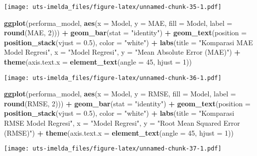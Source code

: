\documentclass[
]{article}
\newenvironment{Shaded}{\begin{snugshade}}{\end{snugshade}}
\newcommand{\AttributeTok}[1]{\textcolor[rgb]{0.13,0.29,0.53}{#1}}
\newcommand{\DecValTok}[1]{\textcolor[rgb]{0.00,0.00,0.81}{#1}}
\newcommand{\FloatTok}[1]{\textcolor[rgb]{0.00,0.00,0.81}{#1}}
\newcommand{\FunctionTok}[1]{\textcolor[rgb]{0.13,0.29,0.53}{\textbf{#1}}}
\newcommand{\NormalTok}[1]{#1}
\newcommand{\SpecialCharTok}[1]{\textcolor[rgb]{0.81,0.36,0.00}{\textbf{#1}}}
\newcommand{\StringTok}[1]{\textcolor[rgb]{0.31,0.60,0.02}{#1}}
\begin{document}
\texttt{[image: uts-imelda\_files/figure-latex/unnamed-chunk-35-1.pdf]}

\begin{Shaded}
\begin{Highlighting}[]
\FunctionTok{ggplot}\NormalTok{(performa\_model, }\FunctionTok{aes}\NormalTok{(}\AttributeTok{x =}\NormalTok{ Model, }\AttributeTok{y =}\NormalTok{ MAE, }\AttributeTok{fill =}\NormalTok{ Model, }\AttributeTok{label =} \FunctionTok{round}\NormalTok{(MAE, }\DecValTok{2}\NormalTok{))) }\SpecialCharTok{+}
  \FunctionTok{geom\_bar}\NormalTok{(}\AttributeTok{stat =} \StringTok{"identity"}\NormalTok{) }\SpecialCharTok{+}
  \FunctionTok{geom\_text}\NormalTok{(}\AttributeTok{position =} \FunctionTok{position\_stack}\NormalTok{(}\AttributeTok{vjust =} \FloatTok{0.5}\NormalTok{), }\AttributeTok{color =} \StringTok{"white"}\NormalTok{) }\SpecialCharTok{+}
  \FunctionTok{labs}\NormalTok{(}\AttributeTok{title =} \StringTok{"Komparasi MAE Model Regresi"}\NormalTok{, }\AttributeTok{x =} \StringTok{"Model Regresi"}\NormalTok{, }\AttributeTok{y =} \StringTok{"Mean Absolute Error (MAE)"}\NormalTok{) }\SpecialCharTok{+}
  \FunctionTok{theme}\NormalTok{(}\AttributeTok{axis.text.x =} \FunctionTok{element\_text}\NormalTok{(}\AttributeTok{angle =} \DecValTok{45}\NormalTok{, }\AttributeTok{hjust =} \DecValTok{1}\NormalTok{))}
\end{Highlighting}
\end{Shaded}

\texttt{[image: uts-imelda\_files/figure-latex/unnamed-chunk-36-1.pdf]}

\begin{Shaded}
\begin{Highlighting}[]
\FunctionTok{ggplot}\NormalTok{(performa\_model, }\FunctionTok{aes}\NormalTok{(}\AttributeTok{x =}\NormalTok{ Model, }\AttributeTok{y =}\NormalTok{ RMSE, }\AttributeTok{fill =}\NormalTok{ Model, }\AttributeTok{label =} \FunctionTok{round}\NormalTok{(RMSE, }\DecValTok{2}\NormalTok{))) }\SpecialCharTok{+}
  \FunctionTok{geom\_bar}\NormalTok{(}\AttributeTok{stat =} \StringTok{"identity"}\NormalTok{) }\SpecialCharTok{+}
  \FunctionTok{geom\_text}\NormalTok{(}\AttributeTok{position =} \FunctionTok{position\_stack}\NormalTok{(}\AttributeTok{vjust =} \FloatTok{0.5}\NormalTok{), }\AttributeTok{color =} \StringTok{"white"}\NormalTok{) }\SpecialCharTok{+}
  \FunctionTok{labs}\NormalTok{(}\AttributeTok{title =} \StringTok{"Komparasi RMSE Model Regresi"}\NormalTok{, }\AttributeTok{x =} \StringTok{"Model Regresi"}\NormalTok{, }\AttributeTok{y =} \StringTok{"Root Mean Squared Error (RMSE)"}\NormalTok{) }\SpecialCharTok{+}
  \FunctionTok{theme}\NormalTok{(}\AttributeTok{axis.text.x =} \FunctionTok{element\_text}\NormalTok{(}\AttributeTok{angle =} \DecValTok{45}\NormalTok{, }\AttributeTok{hjust =} \DecValTok{1}\NormalTok{))}
\end{Highlighting}
\end{Shaded}

\texttt{[image: uts-imelda\_files/figure-latex/unnamed-chunk-37-1.pdf]}
\end{document}
